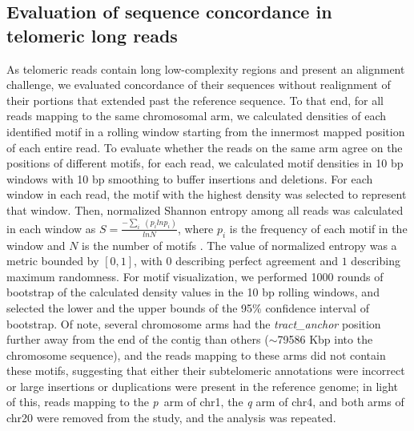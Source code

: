 \documentclass{article}
\begin{document}
\subsection*{Evaluation of sequence concordance in telomeric long reads}
    As telomeric reads contain long low-complexity regions and present an alignment challenge,
        we evaluated concordance of their sequences without realignment of their portions that extended past the reference sequence.
    To that end, for all reads mapping to the same chromosomal arm,
        we calculated densities of each identified motif in a rolling window starting from the innermost mapped position of each entire read.
    To evaluate whether the reads on the same arm agree on the positions of different motifs,
        for each read, we calculated motif densities in 10 bp windows with 10 bp smoothing to buffer insertions and deletions.
    For each window in each read,
        the motif with the highest density was selected to represent that window.
    Then, normalized Shannon entropy among all reads was calculated in each window as $ S = \frac{ - \sum_{i} \; ( p_{i} ln p_{i} )}{ln N} $,
        where $ p_{i} $ is the frequency of each motif in the window and $ N $ is the number of motifs \cite{hepc_entropy}.
    The value of normalized entropy was a metric bounded by $ [ 0, 1 ] $,
        with $ 0 $ describing perfect agreement and $ 1 $ describing maximum randomness.
    For motif visualization,
        we performed 1000 rounds of bootstrap of the calculated density values in the 10 bp rolling windows,
            and selected the lower and the upper bounds of the 95\% confidence interval of bootstrap.
    Of note, several chromosome arms had the \textit{tract\_anchor} position further away from the end of the contig than others
            ($\sim$79\textendash{}586 Kbp into the chromosome sequence),
        and the reads mapping to these arms did not contain these motifs,
        suggesting that
            either their subtelomeric annotations were incorrect
            or large insertions or duplications were present in the reference genome;
        in light of this, reads mapping to
            the \mbox{\textit{p} arm} of chr1,
            the \textit{q} arm of chr4,
            and both arms of chr20
        were removed from the study,
        and the analysis was repeated.
\end{document}
